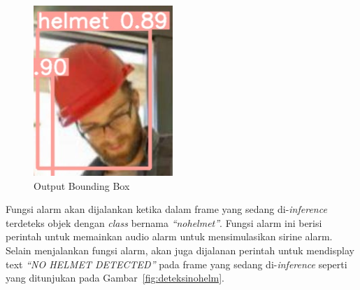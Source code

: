 \begin{figure}[ht]
  \centering
  \includegraphics[scale=1]{gambar/bounding_box.png}
  \caption{Output Bounding Box}
  \label{fig:outputboundingbox}
\end{figure}



\par Fungsi alarm akan dijalankan ketika dalam frame yang sedang di-\emph{inference} terdeteks objek 
dengan \emph{class} bernama \emph{“no\textunderscore helmet”}. Fungsi alarm ini berisi perintah untuk 
memainkan audio alarm untuk mensimulasikan sirine alarm. Selain menjalankan fungsi alarm, akan juga 
dijalanan perintah untuk mendisplay text \emph{“NO HELMET DETECTED”} pada frame yang sedang 
di-\emph{inference} seperti yang ditunjukan pada Gambar~\ref{fig:deteksinohelm}.

